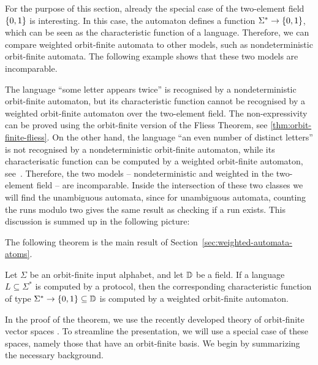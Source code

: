 For the purpose of this section, already the special case of the two-element field $\{0,1\}$ is interesting. In this case, the automaton defines a function $\Sigma^* \to \{0,1\}$, which can be seen as the characteristic function of a language. Therefore, we can compare weighted orbit-finite automata to other models, such as nondeterministic orbit-finite automata. The following example shows that these two  models are incomparable. 

\begin{myexample}\label{ex:weighted-vs-nondet-orbit-finite}
    The language ``some letter appears twice'' is recognised by a nondeterministic orbit-finite automaton, but its characteristic function cannot be  recognised by a weighted orbit-finite automaton over the two-element field. The non-expressivity can be proved using the orbit-finite version of the Fliess Theorem, see \cref{thm:orbit-finite-fliess}. On the other hand, the  language ``an even number of distinct letters'' is not recognised by a nondeterministic orbit-finite automaton, while its characterisatic function can  be computed by a weighted orbit-finite automaton, see~\cite[Example 3.2]{orbitFiniteVectorTheoretics}. Therefore, the two models -- nondeterministic and weighted in the two-element field -- are incomparable. Inside the intersection of these two classes we will find the unambiguous automata, since for unambiguous automata, counting the runs modulo two gives the same result as checking if a run exists. This discussion is summed up in the following picture:
\end{myexample}

The following theorem is the main result of Section~\ref{sec:weighted-automata-atoms}.
\begin{theorem}\label{thm:orbit-finite-protocol-to-weighted}
    Let $\Sigma$ be an orbit-finite input alphabet, and let $\mathbb D$ be a field.
    If a language $L \subseteq \Sigma^*$ is computed by a protocol, then the corresponding characteristic function of type $\Sigma^* \to \{0,1\} \subseteq \mathbb D$  is computed by a weighted orbit-finite automaton.
\end{theorem}

In the proof of the theorem, we use the recently developed theory of orbit-finite vector spaces \cite{orbitFiniteVectorTheoretics}.
To streamline the presentation, we will use a special case of these spaces, namely those that have an orbit-finite basis.
We begin by summarizing the necessary background.

